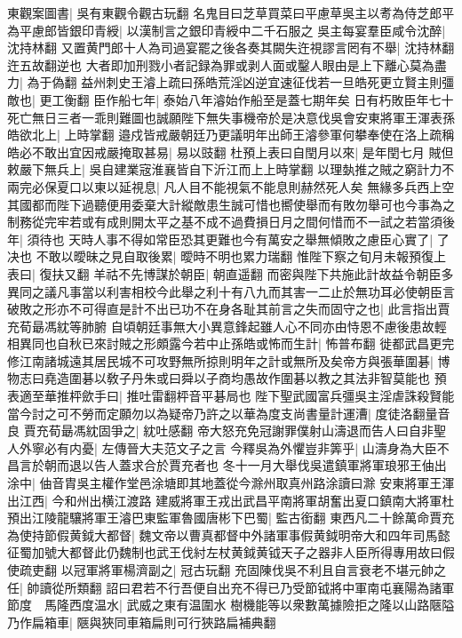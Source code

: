 東觀案圖書|{
	吳有東觀令觀古玩翻}
名鬼目曰芝草買菜曰平慮草吳主以耉為侍芝郎平為平慮郎皆銀印青綬|{
	以漢制言之銀印青綬中二千石服之}
吳主每宴羣臣咸令沈醉|{
	沈持林翻}
又置黄門郎十人為司過宴罷之後各奏其闕失迕視謬言罔有不舉|{
	沈持林翻迕五故翻逆也}
大者即加刑戮小者記録為罪或剥人面或鑿人眼由是上下離心莫為盡力|{
	為于偽翻}
益州刺史王濬上疏曰孫皓荒淫凶逆宜速征伐若一旦皓死更立賢主則彊敵也|{
	更工衡翻}
臣作船七年|{
	泰始八年濬始作船至是蓋七期年矣}
日有朽敗臣年七十死亡無日三者一乖則難圖也誠願陛下無失事機帝於是决意伐吳會安東將軍王渾表孫皓欲北上|{
	上時掌翻}
邉戍皆戒嚴朝廷乃更議明年出師王濬參軍何攀奉使在洛上疏稱皓必不敢出宜因戒嚴掩取甚易|{
	易以豉翻}
杜預上表曰自閏月以來|{
	是年閏七月}
賊但敕嚴下無兵上|{
	吳自建業宼淮襄皆自下沂江而上上時掌翻}
以理埶推之賊之窮計力不兩完必保夏口以東以延視息|{
	凡人目不能視氣不能息則赫然死人矣}
無緣多兵西上空其國都而陛下過聽便用委棄大計縱敵患生誠可惜也嚮使舉而有敗勿舉可也今事為之制務從完牢若或有成則開太平之基不成不過費損日月之間何惜而不一試之若當須後年|{
	須待也}
天時人事不得如常臣恐其更難也今有萬安之舉無傾敗之慮臣心實了|{
	了决也}
不敢以曖昧之見自取後累|{
	曖時不明也累力瑞翻}
惟陛下察之旬月未報預復上表曰|{
	復扶又翻}
羊祜不先博謀於朝臣|{
	朝直遥翻}
而密與陛下共施此計故益令朝臣多異同之議凡事當以利害相校今此舉之利十有八九而其害一二止於無功耳必使朝臣言破敗之形亦不可得直是計不出已功不在身各耻其前言之失而固守之也|{
	此言指出賈充荀朂馮紞等肺腑}
自頃朝廷事無大小異意鋒起雖人心不同亦由恃恩不慮後患故輕相異同也自秋已來討賊之形頗露今若中止孫皓或怖而生計|{
	怖普布翻}
徙都武昌更完修江南諸城遠其居民城不可攻野無所掠則明年之計或無所及矣帝方與張華圍碁|{
	博物志曰堯造圍碁以敎子丹朱或曰舜以子商均愚故作圍碁以教之其法非智莫能也}
預表適至華推枰歛手曰|{
	推吐雷翻枰音平碁局也}
陛下聖武國富兵彊吳主淫虐誅殺賢能當今討之可不勞而定願勿以為疑帝乃許之以華為度支尚書量計運漕|{
	度徒洛翻量音良}
賈充荀朂馮紞固爭之|{
	紞吐感翻}
帝大怒充免冠謝罪僕射山濤退而告人曰自非聖人外寧必有内憂|{
	左傳晉大夫范文子之言}
今釋吳為外懼豈非筭乎|{
	山濤身為大臣不昌言於朝而退以告人蓋求合於賈充者也}
冬十一月大舉伐吳遣鎮軍將軍琅邪王伷出涂中|{
	伷音胄吳主權作堂邑涂塘即其地蓋從今滁州取真州路涂讀曰滁}
安東將軍王渾出江西|{
	今和州出横江渡路}
建威將軍王戎出武昌平南將軍胡奮出夏口鎮南大將軍杜預出江陵龍驤將軍王濬巴東監軍魯國唐彬下巴蜀|{
	監古銜翻}
東西凡二十餘萬命賈充為使持節假黄鉞大都督|{
	魏文帝以曹真都督中外諸軍事假黄鉞明帝大和四年司馬懿征蜀加號大都督此仍魏制也武王伐紂左杖黄鉞黄钺天子之器非人臣所得專用故曰假使疏吏翻}
以冠軍將軍楊濟副之|{
	冠古玩翻}
充固陳伐吳不利且自言衰老不堪元帥之任|{
	帥讀從所類翻}
詔曰君若不行吾便自出充不得已乃受節钺將中軍南屯襄陽為諸軍節度　馬隆西度温水|{
	武威之東有温圍水}
樹機能等以衆數萬據險拒之隆以山路陿隘乃作扁箱車|{
	陿與狹同車箱扁則可行狹路扁補典翻}
